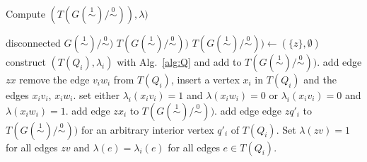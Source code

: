 \documentclass[smallextended]{svjour3}
\newcommand{\Ro}{\mathrel{\overset{0}{\sim}}}
\newcommand{\Rl}{\mathrel{\overset{1}{\sim}}}
\begin{document}
\begin{algorithm}
\caption{Compute $(T(G(\Rl)/\Ro)), \lambda)$}
\label{alg:all}
\begin{algorithmic}[1]
  \REQUIRE disconnected $G(\Rl)/\Ro)$
  \ENSURE $T(G(\Rl)/\Ro))$	
  \STATE $T(G(\Rl)/\Ro)) \gets (\{z\},\emptyset)$
     \STATE	construct $(T(Q_i), \lambda_i)$ with Alg.\ \ref{alg:Q}
		and add to $T(G(\Rl)/\Ro))$.
	\STATE add edge $zx$
        \STATE remove the edge
                $v_iw_i$ from $T(Q_i)$, insert a vertex $x_i$ in $T(Q_i)$
                and the edges $x_iv_i$, $x_iw_i$. 
        \STATE  set either $\lambda_{i}(x_iv_i)=1$ and $\lambda(x_iw_i)=0$
		or $\lambda_{i}(x_iv_i)=0$ and $\lambda(x_iw_i)=1$. 
                \label{step:edge}
	\STATE  add edge $zx_i$ to $T(G(\Rl)/\Ro))$.
     \ELSE \STATE \label{item:z}  	
                add edge edge $zq'_i$ to  $T(G(\Rl)/\Ro))$
		for an arbitrary interior vertex $q'_i$ of $T(Q_i)$. 
     \ENDIF		 
   \ENDFOR
   \STATE       Set $\lambda(zv)=1$ for all edges $zv$ and 
		$\lambda(e)=\lambda_i(e)$ for all edges $e\in T(Q_i)$.	
\end{algorithmic}
\end{algorithm}
\end{document}
